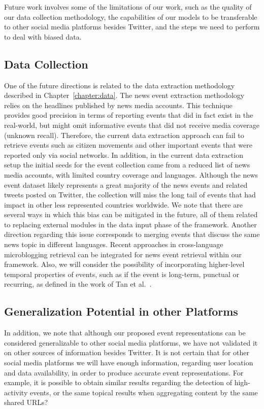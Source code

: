 Future work involves some of the limitations of our work, such as
the quality of our data collection methodology, the capabilities of our models
to be transferable to other social media platforms besides Twitter, and the steps
we need to perform to deal with biased data.

\subsection*{Data Collection}
One of the future directions is related to the data extraction methodology
described in Chapter~\ref{chapter:data}. 
%
The news event extraction methodology relies on the headlines published by news
media accounts. 
%
This technique provides good precision in terms of reporting events that did in
fact exist in the real-world, but might omit informative events that did not
receive media coverage (unknown recall).
%
Therefore, the current data extraction approach can fail to retrieve events such
as citizen movements and other important events that were reported only via
social networks.  
%
In addition, in the current data extraction setup the initial seeds for the
event collection came from a reduced list of news media accounts, with limited
country coverage and languages.
%
Although the news event dataset likely represents a great majority of the news
events and related tweets posted on Twitter, the collection will miss the long
tail of events that had impact in other less represented countries worldwide. 
%
We note that there are several ways in which this bias can be mitigated in the
future, all of them related to replacing external modules in the data input
phase of the framework.
%
Another direction regarding this issue corresponds to merging events that
discuss the same news topic in different languages. 
%
Recent approaches in cross-language microblogging retrieval
\cite{Godavarthy2016} can be integrated for news event retrieval within our
framework.
%
Also, we will consider the possibility of incorporating higher-level temporal
properties of events, such as if the event is long-term, punctual or recurring,
as defined in the work of Tan et al.~\cite{st-model_2009}.


\subsection*{Generalization Potential in other Platforms}
In addition, we note that although our proposed event representations can be
considered generalizable to other social media platforms, we have not validated
it on other sources of information besides Twitter. 
%
It is not certain that for other social media platforms we will have enough
information, regarding user location and data availability, in order to produce
accurate event representations.
%
For example, it is possible to obtain similar results regarding the detection of
high-activity events, or the same topical results when aggregating content by
the same shared URLs?


